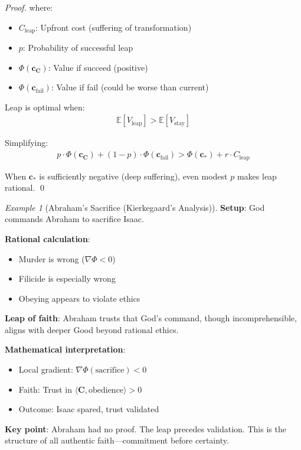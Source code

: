 \documentclass[11pt,a4paper]{article}
\theoremstyle{definition}
\theoremstyle{remark}
\newtheorem{example}{Example}[section]
\newcommand{\cc}{\mathbf{c}}
\begin{document}
\begin{enumerate}
\begin{proof}
where:
\begin{itemize}
    \item \(C_{\text{leap}}\): Upfront cost (suffering of transformation)
    \item \(p\): Probability of successful leap
    \item \(\Phi(\cc_{\mathbf{C}})\): Value if succeed (positive)
    \item \(\Phi(\cc_{\text{fail}})\): Value if fail (could be worse than current)
\end{itemize}

Leap is optimal when:
\begin{align}
\mathbb{E}[V_{\text{leap}}] > \mathbb{E}[V_{\text{stay}}]
\end{align}

Simplifying:
\begin{align}
p \cdot \Phi(\cc_{\mathbf{C}}) + (1-p) \cdot \Phi(\cc_{\text{fail}}) > \Phi(\cc_*) + r \cdot C_{\text{leap}}
\end{align}

When \(\cc_*\) is sufficiently negative (deep suffering), even modest \(p\) makes leap rational. \qed
\end{proof}

\begin{example}[Abraham's Sacrifice (Kierkegaard's Analysis)]
\textbf{Setup}: God commands Abraham to sacrifice Isaac.

\textbf{Rational calculation}:
\begin{itemize}
    \item Murder is wrong (\(\nabla \Phi < 0\))
    \item Filicide is especially wrong
    \item Obeying appears to violate ethics
\end{itemize}

\textbf{Leap of faith}: Abraham trusts that God's command, though incomprehensible, aligns with deeper Good beyond rational ethics.

\textbf{Mathematical interpretation}:
\begin{itemize}
    \item Local gradient: \(\nabla \Phi(\text{sacrifice}) < 0\)
    \item Faith: Trust in \(\langle \mathbf{C}, \text{obedience} \rangle > 0\)
    \item Outcome: Isaac spared, trust validated
\end{itemize}

\textbf{Key point}: Abraham had no proof. The leap precedes validation. This is the structure of all authentic faith—commitment before certainty.


\end{example}
\end{enumerate}
\end{document}
